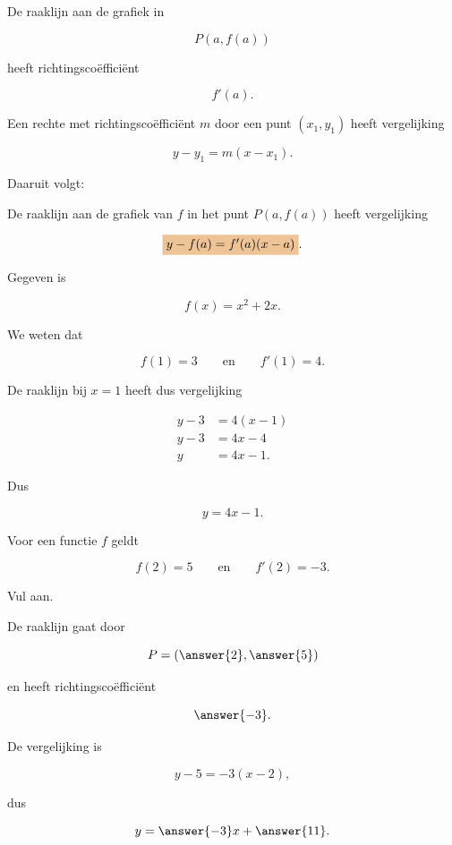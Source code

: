 \documentclass{ximera}
\begin{document}

De raaklijn aan de grafiek in

\[
P(a,f(a))
\]

heeft richtingscoëfficiënt

\[
f'(a).
\]

Een rechte met richtingscoëfficiënt $m$ door een punt
$(x_1,y_1)$ heeft vergelijking

\[
y-y_1=m(x-x_1).
\]

Daaruit volgt:

\begin{definitie}[De raaklijn]
De raaklijn aan de grafiek van $f$ in het punt
$P(a,f(a))$ heeft vergelijking

\[
\important{
y-f(a)=f'(a)(x-a)
}.
\]
\end{definitie}


\begin{voorbeeld}

Gegeven is

\[
f(x)=x^2+2x.
\]

We weten dat

\[
f(1)=3
\qquad\text{en}\qquad
f'(1)=4.
\]

De raaklijn bij $x=1$ heeft dus vergelijking

\begin{align*}
y-3 &= 4(x-1)
\\
y-3 &= 4x-4
\\
y &= 4x-1.
\end{align*}

Dus

\[
\boxed{y=4x-1}.
\]

\end{voorbeeld}


\begin{oefening} {\oefB \ESS}

Voor een functie $f$ geldt

\[
f(2)=5
\qquad\text{en}\qquad
f'(2)=-3.
\]

Vul aan.

De raaklijn gaat door

\[
P=(\answer{2},\answer{5})
\]

en heeft richtingscoëfficiënt

\[
\answer{-3}.
\]

De vergelijking is

\[
y-5=-3(x-2),
\]

dus

\[
y=\answer{-3}x+\answer{11}.
\]

\end{oefening}
\end{document}
